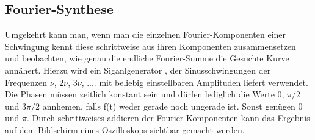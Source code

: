 \subsection{Fourier-Synthese}
\label{sec:Synthese}
Umgekehrt kann man, wenn man die einzelnen Fourier-Komponenten einer Schwingung kennt diese schrittweise aus ihren Komponenten zusammensetzen und beobachten, wie genau die endliche Fourier-Summe die Gesuchte Kurve annähert.
Hierzu wird ein Siganlgenerator , der Sinusschwingungen der Frequenzen $\nu$, $2 \nu$, $3 \nu$, .... mit beliebig einstellbaren Amplituden liefert verwendet.
Die Phasen müssen zeitlich konstant sein und dürfen lediglich die Werte $0$, $\pi / 2$ und $3 \pi / 2$ annhemen, falls f(t) weder gerade noch ungerade ist.
Sonst genügen $0$ und $\pi$.
Durch schrittweises addieren der Fourier-Komponenten kann das Ergebnis auf dem Bildschirm eines Oszilloskops sichtbar gemacht werden.

